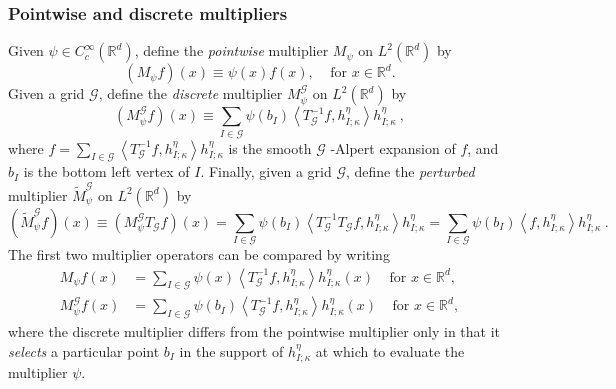 \documentclass{amsart}%
\theoremstyle{plain}
\numberwithin{equation}{section}
\begin{document}
\subsubsection{Pointwise and discrete multipliers\label{subsub point}}

Given $\psi\in C_{c}^{\infty}\left(  \mathbb{R}^{d}\right)  $, define the
\emph{pointwise} multiplier $M_{\psi}$ on $L^{2}\left(  \mathbb{R}^{d}\right)
$ by%
\[
\left(  M_{\psi}f\right)  \left(  x\right)  \equiv\psi\left(  x\right)
f\left(  x\right)  ,\ \ \ \ \ \text{for }x\in\mathbb{R}^{d}.
\]
Given a grid $\mathcal{G}$, define the \emph{discrete} multiplier $M_{\psi
}^{\mathcal{G}}$ on $L^{2}\left(  \mathbb{R}^{d}\right)  $ by%
\begin{equation}
\left(  M_{\psi}^{\mathcal{G}}f\right)  \left(  x\right)  \equiv\sum
_{I\in\mathcal{G}}\psi\left(  b_{I}\right)  \left\langle T_{\mathcal{G}}%
^{-1}f,h_{I;\kappa}^{\eta}\right\rangle h_{I;\kappa}^{\eta}%
\ ,\label{def disc mult}%
\end{equation}
where $f=\sum_{I\in\mathcal{G}}\left\langle T_{\mathcal{G}}^{-1}f,h_{I;\kappa
}^{\eta}\right\rangle h_{I;\kappa}^{\eta}$ is the smooth $\mathcal{G}$ -Alpert
expansion of $f$, and $b_{I}$ is the bottom left vertex of $I$. Finally, given
a grid $\mathcal{G}$, define the \emph{perturbed} multiplier $\widetilde
{M}_{\psi}^{\mathcal{G}}$ on $L^{2}\left(  \mathbb{R}^{d}\right)  $ by%
\[
\left(  \widetilde{M}_{\psi}^{\mathcal{G}}f\right)  \left(  x\right)
\equiv\left(  M_{\psi}^{\mathcal{G}}T_{\mathcal{G}}f\right)  \left(  x\right)
=\sum_{I\in\mathcal{G}}\psi\left(  b_{I}\right)  \left\langle T_{\mathcal{G}%
}^{-1}T_{\mathcal{G}}f,h_{I;\kappa}^{\eta}\right\rangle h_{I;\kappa}^{\eta
}=\sum_{I\in\mathcal{G}}\psi\left(  b_{I}\right)  \left\langle f,h_{I;\kappa
}^{\eta}\right\rangle h_{I;\kappa}^{\eta}\ .
\]
The first two multiplier operators can be compared by writing%
\begin{align*}
M_{\psi}f\left(  x\right)   & =\sum_{I\in\mathcal{G}}\psi\left(  x\right)
\left\langle T_{\mathcal{G}}^{-1}f,h_{I;\kappa}^{\eta}\right\rangle
h_{I;\kappa}^{\eta}\left(  x\right)  \ \ \ \ \ \text{for }x\in\mathbb{R}%
^{d},\\
M_{\psi}^{\mathcal{G}}f\left(  x\right)   & =\sum_{I\in\mathcal{G}}\psi\left(
b_{I}\right)  \left\langle T_{\mathcal{G}}^{-1}f,h_{I;\kappa}^{\eta
}\right\rangle h_{I;\kappa}^{\eta}\left(  x\right)  \ \ \ \ \ \text{for }%
x\in\mathbb{R}^{d},
\end{align*}
where the discrete multiplier differs from the pointwise multiplier only in
that it \emph{selects} a particular point $b_{I}$ in the support of
$h_{I;\kappa}^{\eta}$ at which to evaluate the multiplier $\psi$.
\end{document}
